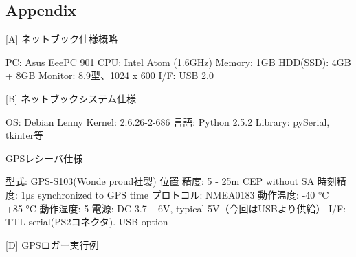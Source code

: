 \documentclass[mingoth,a4paper]{jsarticle}
\begin{document}
\subsection*{Appendix}
[A] ネットブック仕様概略
\begin{commandline}
PC:       Asus EeePC 901 
CPU:      Intel Atom (1.6GHz) 
Memory:   1GB 
HDD(SSD): 4GB + 8GB 
Monitor:  8.9型、1024 x 600 
I/F:      USB 2.0 
\end{commandline}
[B] ネットブックシステム仕様 
\begin{commandline}
OS:      Debian Lenny 
Kernel:  2.6.26-2-686 
言語:    Python 2.5.2 
Library: pySerial, tkinter等 
\end{commandline}
\clearpage
[C] GPSレシーバ仕様 
\begin{commandline}
型式:       GPS-S103(Wonde proud社製)
位置 精度:  5 - 25m CEP without SA
時刻精度:   1μs synchronized to GPS time 
プロトコル: NMEA0183
動作温度:   -40 °C ~ +85 °C 
動作湿度:   5%
電源:       DC 3.7 ~ 6V, typical 5V（今回はUSBより供給）
I/F:        TTL serial(PS2コネクタ). USB option 
\end{commandline}
[D] GPSロガー実行例
\end{document}
